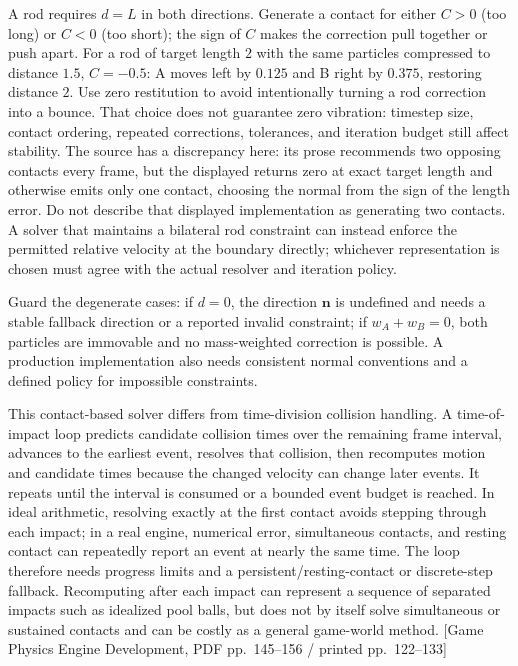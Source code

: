 A rod requires \(d=L\) in both directions. Generate a contact for either \(C>0\) (too long) or \(C<0\) (too short); the sign of \(C\) makes the correction pull together or push apart. For a rod of target length \(2\) with the same particles compressed to distance \(1.5\), \(C=-0.5\): A moves left by \(0.125\) and B right by \(0.375\), restoring distance \(2\). Use zero restitution to avoid intentionally turning a rod correction into a bounce. That choice does not guarantee zero vibration: timestep size, contact ordering, repeated corrections, tolerances, and iteration budget still affect stability. The source has a discrepancy here: its prose recommends two opposing contacts every frame, but the displayed  returns zero at exact target length and otherwise emits only one contact, choosing the normal from the sign of the length error. Do not describe that displayed implementation as generating two contacts. A solver that maintains a bilateral rod constraint can instead enforce the permitted relative velocity at the boundary directly; whichever representation is chosen must agree with the actual resolver and iteration policy.

Guard the degenerate cases: if \(d=0\), the direction \(\mathbf{n}\) is undefined and needs a stable fallback direction or a reported invalid constraint; if \(w_A+w_B=0\), both particles are immovable and no mass-weighted correction is possible. A production implementation also needs consistent normal conventions and a defined policy for impossible constraints.

This contact-based solver differs from time-division collision handling. A time-of-impact loop predicts candidate collision times over the remaining frame interval, advances to the earliest event, resolves that collision, then recomputes motion and candidate times because the changed velocity can change later events. It repeats until the interval is consumed or a bounded event budget is reached. In ideal arithmetic, resolving exactly at the first contact avoids stepping through each impact; in a real engine, numerical error, simultaneous contacts, and resting contact can repeatedly report an event at nearly the same time. The loop therefore needs progress limits and a persistent/resting-contact or discrete-step fallback. Recomputing after each impact can represent a sequence of separated impacts such as idealized pool balls, but does not by itself solve simultaneous or sustained contacts and can be costly as a general game-world method. {[}Game Physics Engine Development, PDF pp.~145--156 / printed pp.~122--133{]}

